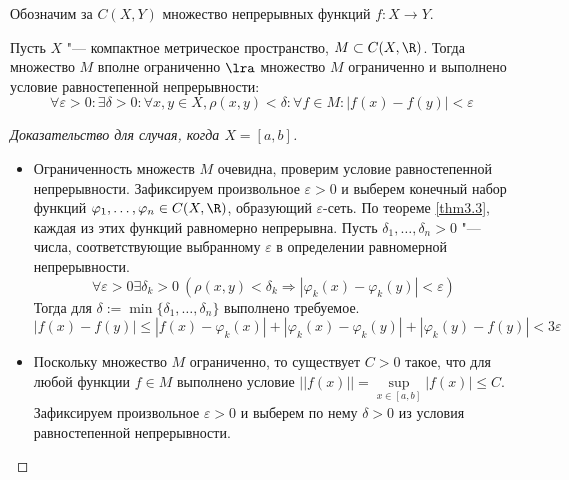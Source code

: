 \begin{definition}
    Обозначим за $C(X, Y)$ множество непрерывных функций $f: X \to Y$.
\end{definition}

\begin{theorem}
    Пусть $X$ "--- компактное метрическое пространство, $M \subset C(X, \R)$. Тогда множество $M$ вполне ограниченно $\lra$ множество $M$ ограниченно и выполнено условие равностепенной непрерывности:
    \[
        \forall \varepsilon > 0: \exists \delta > 0: \forall x, y \in X, \rho(x, y) < \delta: \forall f \in M: |f(x) - f(y)| < \varepsilon 
    \]
\end{theorem}

\begin{proof}[Доказательство для случая, когда {$X = [a, b]$}]~
    \begin{itemize}
        \item[$\ra$] Ограниченность множеств $M$ очевидна, проверим условие равностепенной непрерывности. Зафиксируем произвольное $\varepsilon > 0$ и выберем конечный набор функций $\varphi_1, \dotsc, \varphi_n \in C(X, \R)$, образующий $\varepsilon$-сеть. По теореме \ref{thm3.3}, каждая из этих функций равномерно непрерывна. Пусть $\delta_1, \dotsc, \delta_n > 0$ "--- числа, соответствующие выбранному $\varepsilon$ в определении равномерной непрерывности. 
        \[\forall \varepsilon > 0 \exists \delta_k > 0 \: (\rho(x, y) < \delta_k \Rightarrow |\varphi_k(x)-\varphi_k(y)|<\varepsilon)\]
        Тогда для $\delta := \min \{\delta_1, \dotsc, \delta_n\}$ выполнено требуемое.
        \[|f(x)-f(y)|\leqslant |f(x) - \varphi_k (x)| + |\varphi_k (x) - \varphi_k (y)| + |\varphi_k (y) - f (y)| < 3 \varepsilon\]
        
        \item[$\la$] Поскольку множество $M$ ограниченно, то существует $C > 0$ такое, что для любой функции $f \in M$ выполнено условие $||f(x)||=\sup\limits_{x \in [a, b]}|f(x)| \leqslant C$. Зафиксируем произвольное $\varepsilon > 0$ и выберем по нему $\delta > 0$ из условия равностепенной непрерывности. 
        

\end{itemize}
\end{proof}
